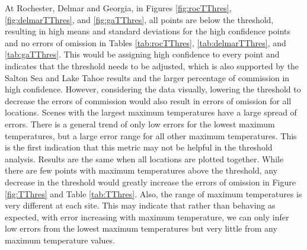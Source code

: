 \documentclass{book}
\begin{document}
At Rochester, Delmar and Georgia, in Figures \ref{fig:rocTThres}, \ref{fig:delmarTThres}, and \ref{fig:gaTThres}, all points are below the threshold, resulting in high means and standard deviations for the high confidence points and no errors of omission in Tables \ref{tab:rocTThres}, \ref{tab:delmarTThres}, and \ref{tab:gaTThres}.  This would be assigning high confidence to every point and indicates that the threshold needs to be adjusted, which is also supported by the Salton Sea and Lake Tahoe results and the larger percentage of commission in high confidence.  However, considering the data visually, lowering the threshold to decrease the errors of commission would also result in errors of omission for all locations.  Scenes with the largest maximum temperatures have a large spread of errors.  There is a general trend of only low errors for the lowest maximum temperatures, but a large error range for all other maximum temperatures.  This is the first indication that this metric may not be helpful in the threshold analysis.  Results are the same when all locations are plotted together.  While there are few points with maximum temperatures above the threshold, any decrease in the threshold would greatly increase the errors of omission in Figure \ref{fig:TThres} and Table \ref{tab:TThres}.  Also, the range of maximum temperatures is very different at each site.  This may indicate that rather than behaving as expected, with error increasing with maximum temperature, we can only infer low errors from the lowest maximum temperatures but very little from any maximum temperature values.
\end{document}
